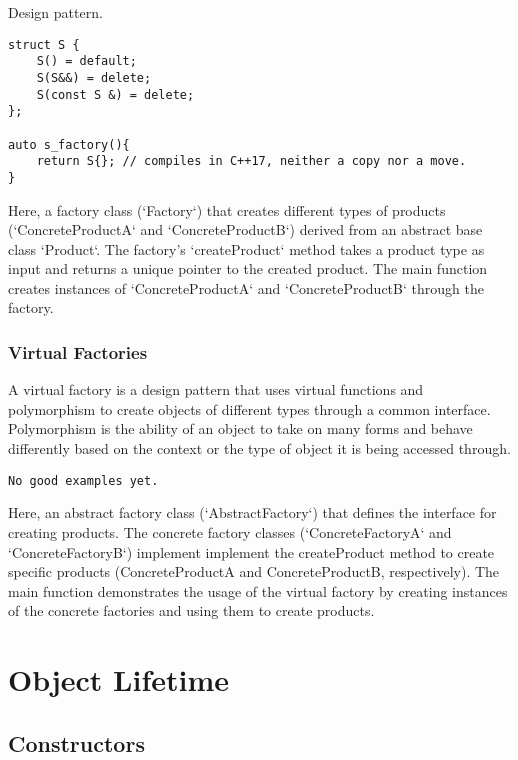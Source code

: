 Design pattern.

\begin{verbatim}
struct S {
    S() = default;
    S(S&&) = delete;
    S(const S &) = delete;
};

auto s_factory(){
    return S{}; // compiles in C++17, neither a copy nor a move.
}
\end{verbatim}

Here, a factory class (`Factory`) that creates different types of products
(`ConcreteProductA` and `ConcreteProductB`) derived from an abstract base class `Product`.
The factory's `createProduct` method takes a product type as input and returns a unique pointer to the created product.
The main function creates instances of `ConcreteProductA` and `ConcreteProductB` through the factory.

\subsection{Virtual Factories}

A virtual factory is a design pattern that uses virtual functions and 
polymorphism to create objects of different types through a common interface.
Polymorphism is the ability of an object to take on many forms
and behave differently based on the context or the type of object it is being accessed through.

\begin{verbatim}
No good examples yet.
\end{verbatim}

Here, an abstract factory class (`AbstractFactory`) that defines the interface for creating products.
The concrete factory classes (`ConcreteFactoryA` and `ConcreteFactoryB`) implement
implement the createProduct method to create specific products (ConcreteProductA and ConcreteProductB, respectively).
The main function demonstrates the usage of 
the virtual factory by creating instances of the concrete factories and using them to create products.

\chapter{Object Lifetime}

\section{Constructors}


